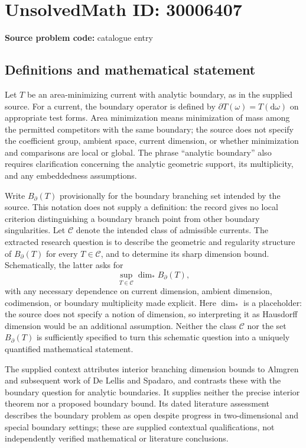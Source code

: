 \documentclass[11pt]{article}
\begin{document}
\section*{UnsolvedMath ID: 30006407}
\textbf{Source problem code:} catalogue entry
\subsection{Definitions and mathematical statement}
Let \(T\) be an area-minimizing current with analytic boundary, as in the supplied source. For a current, the boundary operator is defined by \(\partial T(\omega)=T(\mathrm d\omega)\) on appropriate test forms. Area minimization means minimization of mass among the permitted competitors with the same boundary; the source does not specify the coefficient group, ambient space, current dimension, or whether minimization and comparisons are local or global. The phrase ``analytic boundary'' also requires clarification concerning the analytic geometric support, its multiplicity, and any embeddedness assumptions.

Write \(B_{\partial}(T)\) provisionally for the boundary branching set intended by the source. This notation does not supply a definition: the record gives no local criterion distinguishing a boundary branch point from other boundary singularities. Let \(\mathcal C\) denote the intended class of admissible currents. The extracted research question is to describe the geometric and regularity structure of \(B_{\partial}(T)\) for every \(T\in\mathcal C\), and to determine its sharp dimension bound. Schematically, the latter asks for
\[
\sup_{T\in\mathcal C}\dim_{*} B_{\partial}(T),
\]
with any necessary dependence on current dimension, ambient dimension, codimension, or boundary multiplicity made explicit. Here \(\dim_{*}\) is a placeholder: the source does not specify a notion of dimension, so interpreting it as Hausdorff dimension would be an additional assumption. Neither the class \(\mathcal C\) nor the set \(B_{\partial}(T)\) is sufficiently specified to turn this schematic question into a uniquely quantified mathematical statement.

The supplied context attributes interior branching dimension bounds to Almgren and subsequent work of De Lellis and Spadaro, and contrasts these with the boundary question for analytic boundaries. It supplies neither the precise interior theorem nor a proposed boundary bound. Its dated literature assessment describes the boundary problem as open despite progress in two-dimensional and special boundary settings; these are supplied contextual qualifications, not independently verified mathematical or literature conclusions.
\end{document}
